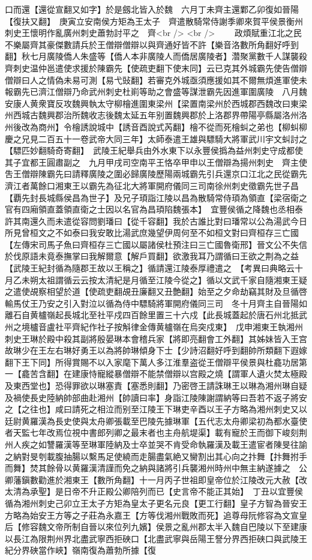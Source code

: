 口而還【還從宣翻又如字】於是劔北皆入於魏　六月丁未齊主還鄴乙卯復如晉陽【復扶又翻】　庚寅立安南侯方矩為王太子　齊遣散騎常侍謝季卿來賀平侯景衡州刺史王懷明作亂廣州刺史蕭勃討平之　齊<br />
<br />
　　政煩賦重江北之民不樂屬齊其豪傑數請兵於王僧辯僧辯以與齊通好皆不許【樂音洛數所角翻好呼到翻】秋七月廣陵僑人朱盛等【僑人本非廣陵人而僑居廣陵者】濳聚黨數千人謀襲殺齊刺史温仲邕遣使求援於陳霸先【使疏吏翻下使末同】云已克其外城霸先使告僧辯僧辯曰人之情偽未易可測【易弋䜴翻】若審克外城亟須應援如其不爾無煩進軍使未報霸先已濟江僧辯乃命武州刺史杜崱等助之會盛等謀泄霸先因進軍圍廣陵　八月魏安康人黄衆寶反攻魏興執太守柳檜進圍東梁州【梁置南梁州於西城郡西魏改曰東梁州西城古魏興郡治所魏收志後魏太延五年别置魏興郡於上洛郡界帶陽亭縣屬洛州洛州後改為商州】令檜誘說城中【誘音酉說式芮翻】檜不從而死檜虯之弟也【柳虯柳慶之兄見二百五十一卷武帝大同三年】太師泰遣王雄與驃騎大將軍武川宇文虯討之【驃匹妙翻騎奇寄翻】　武陵王紀舉兵由外水東下以永豐侯撝為益州刺史守成都使其子宜都王圓肅副之　九月甲戌司空南平王恪卒甲申以王僧辯為揚州刺史　齊主使吿王僧辯陳霸先曰請釋廣陵之圍必歸廣陵歷陽兩城霸先引兵還京口江北之民從霸先濟江者萬餘口湘東王以霸先為征北大將軍開府儀同三司南徐州刺史徵霸先世子昌【覇先封長城縣侯昌為世子】及兄子頊詣江陵以昌為散騎常侍頊為領直【梁宿衛之官有四廂領直蓋領直衛之士因以名官為昌頊陷魏張本】　宜豐侯循之降魏也丞相泰許其南還久而未遣從容問劉璠曰【從千容翻】我於古誰比對曰璠常以公為湯武今日所見曾桓文之不如泰曰我安敢比湯武庶幾望伊周何至不如桓文對曰齊桓存三亡國【左傳宋司馬子魚曰齊桓存三亡國以屬諸侯杜預注曰三亡國魯衛邢】晉文公不失信於伐原語未竟泰撫掌曰我解爾意【解戶買翻】欲激我耳乃謂循曰王欲之荆為之益【武陵王紀封循為隨郡王故以王稱之】循請還江陵泰厚禮遣之　【考異曰典略云十月乙未朔太祖謂循云云按太清紀是月循至江陵今從之】循以文武千家自隨湘東王疑之遣使覘察相望於道【使疏吏翻覘丑廉翻又丑艶翻】始至之夕命劫竊其財及旦循啓輸馬仗王乃安之引入對泣以循為侍中驃騎將軍開府儀同三司　冬十月齊主自晉陽如離石自黄櫨嶺起長城北至社平戍四百餘里置三十六戍【此長城蓋起於唐石州北抵武州之境櫨音盧社平齊紀作社子按斛律金傳黄櫨嶺在烏突戍東】　戊申湘東王執湘州刺史王琳於殿中殺其副將殷晏琳本會稽兵家【將即亮翻會工外翻】其姊妹皆入王宫故琳少在王左右琳好勇王以為將帥琳傾身下士【少詩沼翻好呼到翻帥所類翻下遐嫁翻下王下同】所得賞賜不以入家麾下萬人多江淮羣盗從王僧辯平侯景與杜龕功居第一【龕苦含翻】在建康恃寵縱暴僧辯不能禁僧辯以宫殿之燒【謂軍人遺火焚太極殿及東西堂也】恐得罪欲以琳塞責【塞悉則翻】乃密啓王請誅琳王以琳為湘州琳自疑及禍使長史陸納帥部曲赴湘州【帥讀曰率】身詣江陵陳謝謂納等曰吾若不返子將安之【之往也】咸曰請死之相泣而别至江陵王下琳吏辛酉以王子方略為湘州刺史又以廷尉黄羅漢為長史使與太舟卿張載至巴陵先據琳軍【五代志太舟卿梁初為都水臺使者天監七年改焉位視中書郎列卿之最末者也主舟航堤渠】載有寵於王而御下峻刻荆州人疾之如讐羅漢等至琳軍陸納及士卒並哭不肯受命執羅漢及載王遣宦者陳旻往諭之納對旻刳載腹抽腸以繫馬足使繞而走腸盡氣絶又臠割出其心向之抃舞【抃舞拊手而舞】焚其餘骨以黄羅漢清謹而免之納與諸將引兵襲湘州時州中無主納遂據之　公卿藩鎭數勸進於湘東王【數所角翻】十一月丙子世祖即皇帝位於江陵改元大赦【改太清為承聖】是日帝不升正殿公卿陪列而已【史言帝不能正其始】　丁丑以宜豐侯循為湘州刺史己卯立王太子方矩為皇太子更名元良【更工行翻】皇子方智為晉安王方略為始安王方等之子莊為永嘉王【方等伐湘州戰敗而死】追尊母阮修容為文宣皇后【修容魏文帝所制自晉以來位列九嬪】侯景之亂州郡太半入魏自巴陵以下至建康以長江為限荆州界北盡武寧西拒硤口【北盡武寧與岳陽王詧分界西拒硤口與武陵王紀分界硤當作峽】嶺南復為蕭勃所據【復